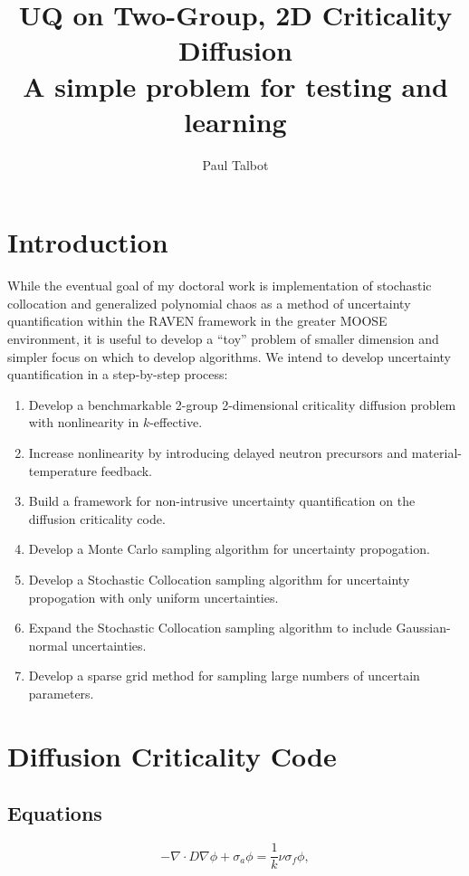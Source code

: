\documentclass[11pt]{article} %
\title{UQ on Two-Group, 2D Criticality Diffusion\\ \normalsize A simple problem for testing and learning}
\author{Paul Talbot}
\begin{document}
\maketitle
\section{Introduction}
While the eventual goal of my doctoral work is implementation of stochastic collocation and generalized polynomial chaos as a method of uncertainty quantification within the RAVEN framework in the greater MOOSE environment, it is useful to develop a ``toy'' problem of smaller dimension and simpler focus on which to develop algorithms.  We intend to develop uncertainty quantification in a step-by-step process:
\begin{enumerate}
\item Develop a benchmarkable 2-group 2-dimensional criticality diffusion problem with nonlinearity in $k$-effective.
\item Increase nonlinearity by introducing delayed neutron precursors and material-temperature feedback.
\item Build a framework for non-intrusive uncertainty quantification on the diffusion criticality code.
\item Develop a Monte Carlo sampling algorithm for uncertainty propogation.
\item Develop a Stochastic Collocation sampling algorithm for uncertainty propogation with only uniform uncertainties.
\item Expand the Stochastic Collocation sampling algorithm to include Gaussian-normal uncertainties.
\item Develop a sparse grid method for sampling large numbers of uncertain parameters.
\end{enumerate}

\section{Diffusion Criticality Code}
\subsection{Equations}
\begin{equation}
-\nabla\cdot D\nabla\phi+\sigma_a\phi=\frac{1}{k}\nu\sigma_f\phi,
\end{equation}
\end{document}
